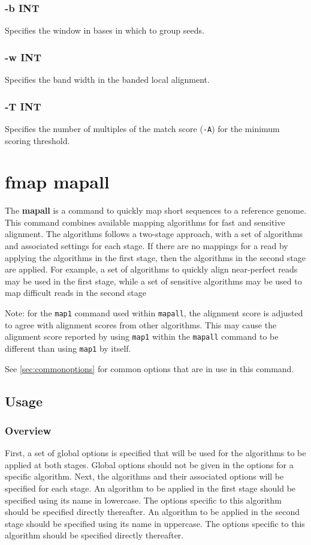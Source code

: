 \documentclass[a4paper,12pt]{book}
\newcommand{\TT}[1]{{\tt #1}} %
\newcommand{\BF}[1]{{\bf #1}} %
\begin{document}
\subsubsection{-b INT}
Specifies the window in bases in which to group seeds.

\subsubsection{-w INT}
Specifies the band width in the banded local alignment.

\subsubsection{-T INT}
Specifies the number of multiples of the match score (\TT{-A}) for the minimum scoring threshold.

\section{fmap mapall}
\label{sec:mapall}
The \BF{mapall} is a command to quickly map short sequences to a reference genome.
This command combines available mapping algorithms for fast and sensitive alignment.
The algorithms follows a two-stage approach, with a set of algorithms and associated settings for each stage.
If there are no mappings for a read by applying the algorithms in the first stage, then the algorithms in the second stage are applied. 
For example, a set of algorithms to quickly align near-perfect reads may be used in the first stage, while a set of sensitive algorithms may be used to map difficult reads in the second stage

Note: for the \TT{map1} command used within \TT{mapall}, the alignment score is adjusted to agree with alignment scores from other algorithms.
This may cause the alignment score reported by using \TT{map1} within the \TT{mapall} command to be different than using \TT{map1} by itself.

See \autoref{sec:commonoptions} for common options that are in use in this command.

\subsection{Usage}

\subsubsection{Overview}
First, a set of global options is specified that will be used for the algorithms to be applied at both stages.
Global options should not be given in the options for a specific algorithm.
Next, the algorithms and their associated options will be specified for each stage.
An algorithm to be applied in the first stage should be specified using its name in lowercase.
The options specific to this algorithm should be specified directly thereafter.
An algorithm to be applied in the second stage should be specified using its name in uppercase.
The options specific to this algorithm should be specified directly thereafter.
\end{document}
